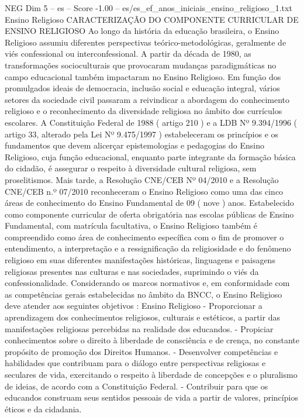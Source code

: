 \begin{textsample}{NEG Dim 5 – es – Score -1.00 – es/es\_ef\_anos\_iniciais\_ensino\_religioso\_1.txt}  \label{ex:f5_neg_186}
Ensino Religioso CARACTERIZAÇÃO DO COMPONENTE CURRICULAR DE ENSINO RELIGIOSO Ao longo da história da educação brasileira, o Ensino Religioso assumiu diferentes perspectivas teórico-metodológicas, geralmente de viés confessional ou interconfessional.
A partir da década de 1980, as transformações socioculturais que provocaram mudanças paradigmáticas no campo educacional também impactaram no Ensino Religioso.
Em função dos promulgados ideais de democracia, inclusão social e educação integral, vários setores da sociedade civil passaram a reivindicar a abordagem do conhecimento religioso e o reconhecimento da diversidade religiosa no âmbito dos currículos escolares.
A Constituição Federal de 1988 ( artigo 210 ) e a LDB Nº 9.394/1996 ( artigo 33, alterado pela Lei Nº 9.475/1997 ) estabeleceram os princípios e os fundamentos que devem alicerçar epistemologias e pedagogias do Ensino Religioso, cuja função educacional, enquanto parte integrante da formação básica do cidadão, é assegurar o respeito à diversidade cultural religiosa, sem proselitismos.
Mais tarde, a Resolução CNE/CEB Nº 04/2010 e a Resolução CNE/CEB n.º 07/2010 reconheceram o Ensino Religioso como uma das cinco áreas de conhecimento do Ensino Fundamental de 09 ( nove ) anos.
Estabelecido como componente curricular de oferta obrigatória nas escolas públicas de Ensino Fundamental, com matrícula facultativa, o Ensino Religioso também é compreendido como área de conhecimento específica com o fim de promover o entendimento, a interpretação e a ressignificação da religiosidade e do fenômeno religioso em suas diferentes manifestações históricas, linguagens e paisagens religiosas presentes nas culturas e nas sociedades, suprimindo o viés da confessionalidade.
Considerando os marcos normativos e, em conformidade com as competências gerais estabelecidas no âmbito da BNCC, o Ensino Religioso deve atender aos seguintes objetivos : Ensino Religioso - Proporcionar a aprendizagem dos conhecimentos religiosos, culturais e estéticos, a partir das manifestações religiosas percebidas na realidade dos educandos. - Propiciar conhecimentos sobre o direito à liberdade de consciência e de crença, no constante propósito de promoção dos Direitos Humanos. - Desenvolver competências e habilidades que contribuam para o diálogo entre perspectivas religiosas e seculares de vida, exercitando o respeito à liberdade de concepções e o pluralismo de ideias, de acordo com a Constituição Federal. - Contribuir para que os educandos construam seus sentidos pessoais de vida a partir de valores, princípios éticos e da cidadania.

\end{textsample}
